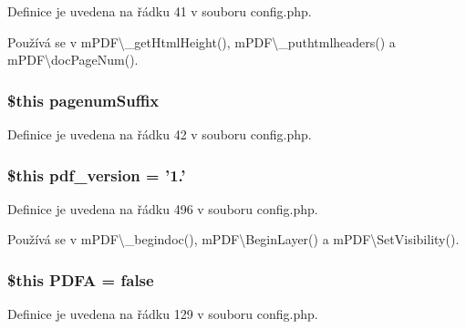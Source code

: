 Definice je uvedena na řádku 41 v souboru config.\-php.



Používá se v m\-P\-D\-F\textbackslash{}\-\_\-get\-Html\-Height(), m\-P\-D\-F\textbackslash{}\-\_\-puthtmlheaders() a m\-P\-D\-F\textbackslash{}doc\-Page\-Num().

\hypertarget{config_8php_a608af622aef738884ad70e15c445c694}{
\subsubsection[{pagenum\-Suffix}]{\setlength{\rightskip}{0pt plus 5cm}\$this pagenum\-Suffix}}\label{config_8php_a608af622aef738884ad70e15c445c694}


Definice je uvedena na řádku 42 v souboru config.\-php.

\hypertarget{config_8php_aaa2874721f5bf2ae96787cd0cda1a2df}{
\subsubsection[{pdf\-\_\-version}]{\setlength{\rightskip}{0pt plus 5cm}\$this pdf\-\_\-version = '1.'}}\label{config_8php_aaa2874721f5bf2ae96787cd0cda1a2df}


Definice je uvedena na řádku 496 v souboru config.\-php.



Používá se v m\-P\-D\-F\textbackslash{}\-\_\-begindoc(), m\-P\-D\-F\textbackslash{}\-Begin\-Layer() a m\-P\-D\-F\textbackslash{}\-Set\-Visibility().

\hypertarget{config_8php_a73c58821a56f993b6e96eeafa3a1f009}{
\subsubsection[{P\-D\-F\-A}]{\setlength{\rightskip}{0pt plus 5cm}\$this P\-D\-F\-A = {\bf false}}}\label{config_8php_a73c58821a56f993b6e96eeafa3a1f009}


Definice je uvedena na řádku 129 v souboru config.\-php.



